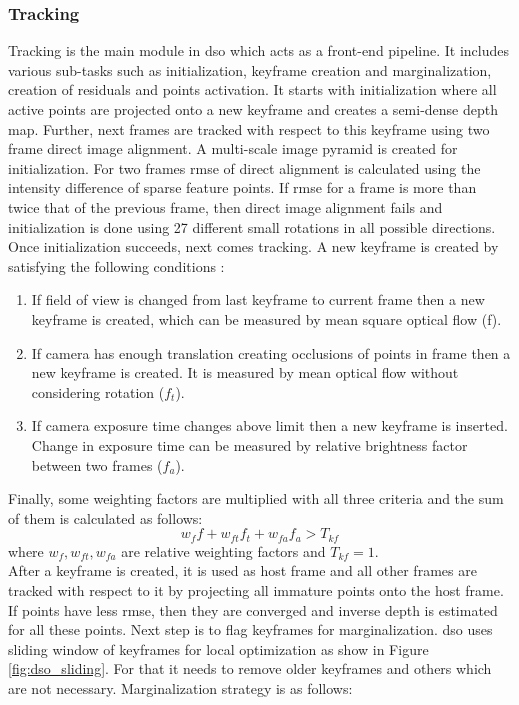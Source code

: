 \subsubsection{Tracking}
Tracking is the main module in \acrshort{dso} which acts as a front-end pipeline. It includes various sub-tasks such as initialization, keyframe creation and marginalization, creation of residuals and points activation. It starts with initialization where all active points are projected onto a new keyframe and creates a semi-dense depth map. Further, next frames are tracked with respect to this keyframe using two frame direct image alignment. A multi-scale image pyramid is created for initialization. For two frames \acrshort{rmse} of direct alignment is calculated using the intensity difference of sparse feature points. If \acrshort{rmse} for a frame is more than twice that of the previous frame, then direct image alignment fails and initialization is done using 27 different small rotations in all possible directions. Once initialization succeeds, next comes tracking. A new keyframe is created by satisfying the following conditions :    
\begin{enumerate}
	\item If field of view is changed from last keyframe to current frame then a new keyframe is created, which can be measured by mean square optical flow (f).
	\item If camera has enough translation creating occlusions of points in frame then a new keyframe is created. It is measured by mean optical flow without considering rotation ($f_{t}$).
	\item If camera exposure time changes above limit then a new keyframe is inserted. Change in exposure time can be measured by relative brightness factor between two frames ($f_{a}$).
\end{enumerate}
Finally, some weighting factors are multiplied with all three criteria and the sum of them is calculated as follows: 
\begin{equation*}
  w_{f} f + w_{ft} f_{t} + w_{fa} f_{a} > T_{kf}
\end{equation*} 
where $w_{f}, w_{ft}, w_{fa} $ are relative weighting factors and $ T_{kf} = 1. $ \\
\newline
After a keyframe is created, it is used as host frame and all other frames are tracked with respect to it by projecting all immature points onto the host frame. If points have less \acrshort{rmse}, then they are converged and inverse depth is estimated for all these points. Next step is to flag keyframes for marginalization. \acrshort{dso} uses sliding window of keyframes for local optimization as show in Figure \ref{fig:dso_sliding}. For that it needs to remove older keyframes and others which are not necessary. Marginalization strategy is as follows: 
